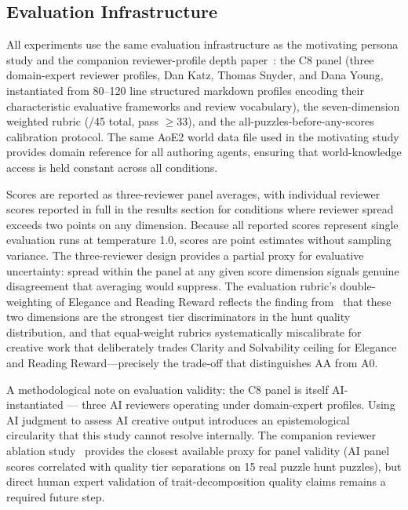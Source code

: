 \subsection{Evaluation Infrastructure}

All experiments use the same evaluation infrastructure as the motivating persona study and the companion reviewer-profile depth paper~\cite{dellaLibera2025panel}: the C8 panel (three domain-expert reviewer profiles, Dan Katz, Thomas Snyder, and Dana Young, instantiated from 80--120 line structured markdown profiles encoding their characteristic evaluative frameworks and review vocabulary), the seven-dimension weighted rubric (/45 total, pass $\geq 33$), and the all-puzzles-before-any-scores calibration protocol. The same AoE2 world data file used in the motivating study provides domain reference for all authoring agents, ensuring that world-knowledge access is held constant across all conditions.

Scores are reported as three-reviewer panel averages, with individual reviewer scores reported in full in the results section for conditions where reviewer spread exceeds two points on any dimension. Because all reported scores represent single evaluation runs at temperature 1.0, scores are point estimates without sampling variance. The three-reviewer design provides a partial proxy for evaluative uncertainty: spread within the panel at any given score dimension signals genuine disagreement that averaging would suppress. The evaluation rubric's double-weighting of Elegance and Reading Reward reflects the finding from~\cite{dellaLibera2025panel} that these two dimensions are the strongest tier discriminators in the hunt quality distribution, and that equal-weight rubrics systematically miscalibrate for creative work that deliberately trades Clarity and Solvability ceiling for Elegance and Reading Reward---precisely the trade-off that distinguishes AA from A0.

A methodological note on evaluation validity: the C8 panel is itself AI-instantiated --- three AI reviewers operating under domain-expert profiles. Using AI judgment to assess AI creative output introduces an epistemological circularity that this study cannot resolve internally. The companion reviewer ablation study~\cite{dellaLibera2025panel} provides the closest available proxy for panel validity (AI panel scores correlated with quality tier separations on 15 real puzzle hunt puzzles), but direct human expert validation of trait-decomposition quality claims remains a required future step.
